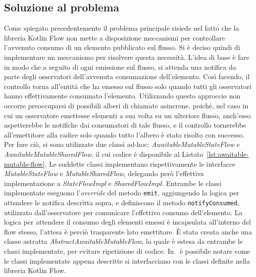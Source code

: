 \documentclass[12pt,a4paper,openright,twoside]{book}
\begin{document}
\subsection{Soluzione al problema}
Come spiegato precedentemente il problema principale risiede nel fatto che la libreria Kotlin Flow non mette a disposizione meccanismi per controllare l'avvenuto consumo di un elemento pubblicato sul flusso. Si è deciso quindi di implementare un meccanismo per risolvere questa necessità. 
L'idea di base è fare in modo che a seguito di ogni emissione sul flusso, si attenda una notifica da parte degli osservatori dell'avvenuta consumazione dell'elemento. Così facendo, il controllo torna all'entità che ha emesso sul flusso solo quando tutti gli osservatori hanno effettivamente consumato l'elemento. Utilizzando questo approccio non occorre preoccuparsi di possibili alberi di chiamate asincrone, poiché, nel caso in cui un osservatore emettesse elementi a sua volta su un ulteriore flusso, anch'esso aspetterebbe le notifiche dai consumatori di tale flusso, e il controllo tornerebbe all'emettitore alla radice solo quando tutto l'albero è stato risolto con successo.
Per fare ciò, si sono utilizzate due classi ad-hoc: \textit{AwaitableMutableStateFlow} e \textit{AwaitableMutableSharedFlow}, il cui codice è disponibile al Listato~\ref{lst:awaitable-mutable-flow}. Le suddette classi implementano rispettivamente le interfacce \textit{MutableStateFlow} e \textit{MutableSharedFlow}, delegando però l'effettiva implementazione a \textit{StateFlowImpl} e \textit{SharedFlowImpl}. Entrambe le classi implementate eseguono l'\textit{override} del metodo \texttt{emit}, aggiungendo la logica per attendere le notifica descritta sopra, e definiscono il metodo \texttt{notifyConsumed}, utilizzato dall'osservatore per comunicare l'effettivo consumo dell'elemento. La logica per attendere il consumo degli elementi emessi è incapsulata all'interno del flow stesso, l'attesa è perciò trasparente lato emettitore. È stata creata anche una classe astratta \textit{AbstractAwaitableMutableFlow}, la quale è estesa da entrambe le classi implementate, per evitare ripetizione di codice. 
In~ è possibile notare come le classi implementate appena descritte si interfacciano con le classi definite nella libreria Kotlin Flow. 
\end{document}
